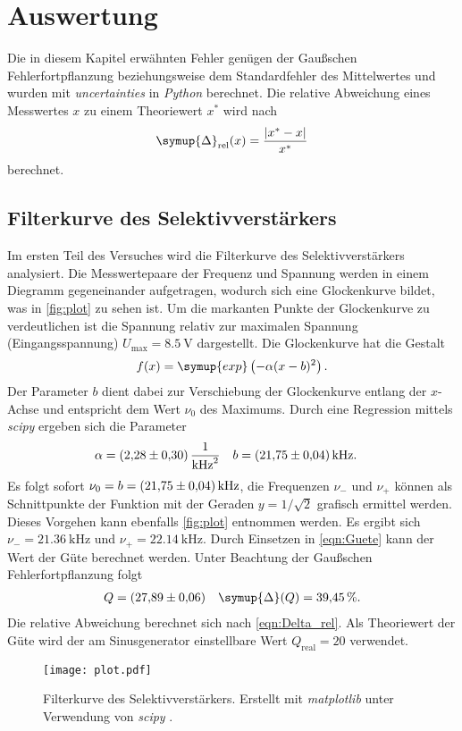 \section{Auswertung}
\label{sec:Auswertung}
Die in diesem Kapitel erwähnten Fehler genügen der Gaußschen Fehlerfortpflanzung beziehungsweise dem Standardfehler des Mittelwertes und wurden mit \textit{uncertainties}
\cite{uncertainties} in \textit{Python} berechnet. Die relative Abweichung eines Messwertes $x$ zu einem Theoriewert $x^*$ wird nach 
\begin{equation}
  \label{eqn:Delta_rel}
  \symup{\Delta}_\text{rel}(x) = \frac{|x^* - x|}{x^*}
\end{equation}
berechnet.

\subsection{Filterkurve des Selektivverstärkers}
\label{subsec:A_Filterkurve}
Im ersten Teil des Versuches wird die Filterkurve des Selektivverstärkers analysiert. Die Messwertepaare der Frequenz und Spannung werden in einem Diegramm gegeneinander
aufgetragen, wodurch sich eine Glockenkurve bildet, was in \autoref{fig:plot} zu sehen ist. Um die markanten Punkte der Glockenkurve zu verdeutlichen ist die Spannung 
relativ zur maximalen Spannung (Eingangsspannung) $U_\text{max} = \qty{8.5}{\volt}$ dargestellt. 
Die Glockenkurve hat die Gestalt
\begin{equation*}
  \label{eqn:Gaussglocke}
  f(x) = \symup{exp}\left(-\alpha(x-b)^2\right).
\end{equation*}
Der Parameter $b$ dient dabei zur Verschiebung der Glockenkurve entlang der $x$-Achse und entspricht dem Wert $\nu_0$ des Maximums. 
Durch eine Regression mittels \textit{scipy} \cite{scipy} ergeben sich die Parameter
\begin{align}
  \label{eqn:Parameter}
  \alpha &= \qty{2.28 +- 0.3}{\per\kilo\hertz\squared} & b &= \qty{21.75 +- 0.04}{\kilo\hertz}.
\end{align}
Es folgt sofort $\nu_0 = b = \qty{21.75 +- 0.04}{\kilo\hertz}$, die Frequenzen $\nu_-$ und $\nu_+$ können als Schnittpunkte der Funktion mit der Geraden $y = 1/\sqrt{2}$
grafisch ermittel werden. Dieses Vorgehen kann ebenfalls \autoref{fig:plot} entnommen werden. 
Es ergibt sich $\nu_- = \qty{21.36}{\kilo\hertz}$ und $\nu_+ = \qty{22.14}{\kilo\hertz}$. 
Durch Einsetzen in \autoref{eqn:Guete} kann der Wert der Güte berechnet werden.
Unter Beachtung der Gaußschen Fehlerfortpflanzung folgt
\begin{align*}
  Q &= \qty{27.89 +- 0.06}{} & \symup{\Delta}(Q) = \qty{39.45}{\percent}.
\end{align*}
Die relative Abweichung berechnet sich nach \autoref{eqn:Delta_rel}. Als Theoriewert der Güte wird der am Sinusgenerator einstellbare Wert $Q_\text{real} = 20$ verwendet.

\begin{figure}
  \centering
  \texttt{[image: plot.pdf]}
  \caption{Filterkurve des Selektivverstärkers. Erstellt mit \textit{matplotlib} \cite{matplotlib} unter Verwendung von \textit{scipy} \cite{scipy}.}
  \label{fig:plot}
\end{figure}
